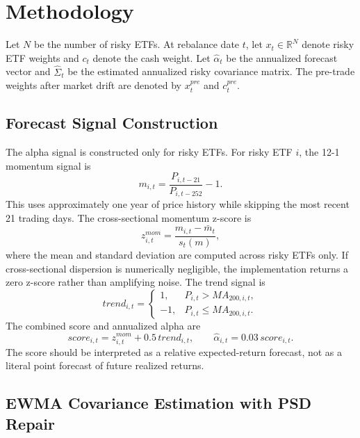\documentclass[11pt]{article}
\begin{document}
\section{Methodology}
\label{sec:methodology}

Let \(N\) be the number of risky ETFs. At rebalance date \(t\), let
\(x_t\in\mathbb{R}^N\) denote risky ETF weights and \(c_t\) denote the cash weight.
Let \(\hat{\alpha}_t\) be the annualized forecast vector and
\(\hat{\Sigma}_t\) be the estimated annualized risky covariance matrix. The
pre-trade weights after market drift are denoted by \(x_t^{pre}\) and
\(c_t^{pre}\).

\subsection{Forecast Signal Construction}

The alpha signal is constructed only for risky ETFs. For risky ETF \(i\), the
12-1 momentum signal is
\begin{equation}
m_{i,t}=\frac{P_{i,t-21}}{P_{i,t-252}}-1.
\end{equation}
This uses approximately one year of price history while skipping the most recent
21 trading days. The cross-sectional momentum z-score is
\begin{equation}
z^{mom}_{i,t}=\frac{m_{i,t}-\bar{m}_t}{s_t(m)},
\end{equation}
where the mean and standard deviation are computed across risky ETFs only. If
cross-sectional dispersion is numerically negligible, the implementation returns a
zero z-score rather than amplifying noise. The trend signal is
\begin{equation}
trend_{i,t}=
\begin{cases}
1, & P_{i,t}>MA_{200,i,t},\\
-1, & P_{i,t}\le MA_{200,i,t}.
\end{cases}
\end{equation}
The combined score and annualized alpha are
\begin{equation}
score_{i,t}=z^{mom}_{i,t}+0.5\,trend_{i,t},\qquad
\hat{\alpha}_{i,t}=0.03\,score_{i,t}.
\end{equation}
The score should be interpreted as a relative expected-return forecast, not as a
literal point forecast of future realized returns.

\subsection{EWMA Covariance Estimation with PSD Repair}
\end{document}
